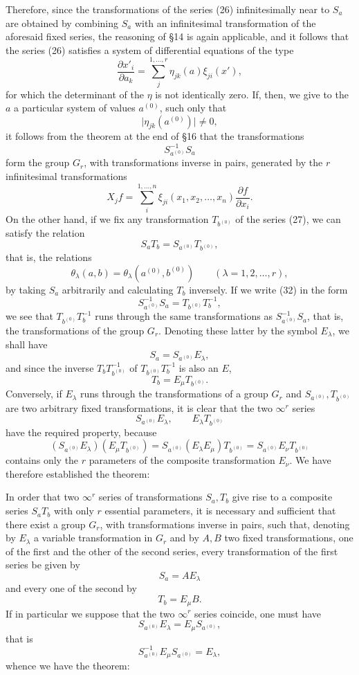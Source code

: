 \documentclass[11pt]{book}
\begin{document}
Therefore, since the transformations of the series (26) infinitesimally near to $S_a$ are obtained by combining $S_a$ with an infinitesimal transformation of the aforesaid fixed series, the reasoning of \S{}14 is again applicable, and it follows that the series (26) satisfies a system of differential equations of the type
\[
 \frac{\partial x'_i}{\partial a_k}=\sum\limits_j^{1,\ldots,r}\eta_{jk}(a)\xi_{ji}(x'),
\]
for which the determinant of the $\eta$ is not identically zero. If, then, we give to the $a$ a particular system of values $a^{(0)}$, such only that
\[
 \lvert\eta_{jk}(a^{(0)})\rvert\ne0,
\]
it follows from the theorem at the end of \S{}16 that the transformations
\[
 S_{a^{(0)}}^{-1}S_a
\]
form the group $G_r$, with transformations inverse in pairs, generated by the $r$ infinitesimal transformations
\[
 X_j f=\sum\limits_i^{1,\ldots,n}\xi_{ji}(x_1,x_2,\ldots,x_n)\frac{\partial f}{\partial x_i}.
\]
On the other hand, if we fix any transformation $T_{b^{(0)}}$ of the series (27), we can satisfy the relation
\[
 S_aT_b=S_{a^{(0)}}T_{b^{(0)}},
\]
that is, the relations
\begin{equation*}\tag{32}
 \theta_\lambda(a,b)=\theta_\lambda(a^{(0)},b^{(0)})
 \qquad (\lambda=1,2,\ldots,r),
\end{equation*}
by taking $S_a$ arbitrarily and calculating $T_b$ inversely. If we write (32) in the form
\[
 S_{a^{(0)}}^{-1}S_a=T_{b^{(0)}}T_b^{-1},
\]
we see that $T_{b^{(0)}}T_b^{-1}$ runs through the same transformations as $S_{a^{(0)}}^{-1}S_a$, that is, the transformations of the group $G_r$. Denoting these latter by the symbol $E_\lambda$, we shall have
\[
 S_a=S_{a^{(0)}}E_\lambda,
\]
and since the inverse $T_bT_{b^{(0)}}^{-1}$ of $T_{b^{(0)}}T_b^{-1}$ is also an $E$,
\[
 T_b=E_\mu T_{b^{(0)}}.
\]
Conversely, if $E_\lambda$ runs through the transformations of a group $G_r$ and $S_{a^{(0)}},T_{b^{(0)}}$ are two arbitrary fixed transformations, it is clear that the two $\infty^r$ series
\[
 S_{a^{(0)}}E_\lambda,
 \qquad
 E_\lambda T_{b^{(0)}}
\]
have the required property, because
\[
 (S_{a^{(0)}}E_\lambda)(E_\mu T_{b^{(0)}})
 =S_{a^{(0)}}(E_\lambda E_\mu)T_{b^{(0)}}
 =S_{a^{(0)}}E_\nu T_{b^{(0)}}
\]
contains only the $r$ parameters of the composite transformation $E_\nu$. We have therefore established the theorem:

In order that two $\infty^r$ series of transformations $S_a,T_b$ give rise to a composite series $S_aT_b$ with only $r$ essential parameters, it is necessary and sufficient that there exist a group $G_r$, with transformations inverse in pairs, such that, denoting by $E_\lambda$ a variable transformation in $G_r$ and by $A,B$ two fixed transformations, one of the first and the other of the second series, every transformation of the first series be given by
\[
 S_a=AE_\lambda
\]
and every one of the second by
\[
 T_b=E_\mu B.
\]
If in particular we suppose that the two $\infty^r$ series coincide, one must have
\[
 S_{a^{(0)}}E_\lambda=E_\mu S_{a^{(0)}},
\]
that is
\[
 S_{a^{(0)}}^{-1}E_\mu S_{a^{(0)}}=E_\lambda,
\]
whence we have the theorem:
\end{document}
